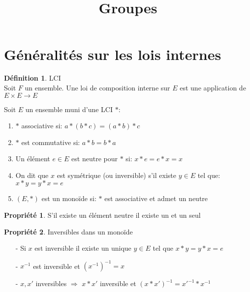 \documentclass[fleqn]{article}
\title{Groupes}
\date{}
\theoremstyle{definition} \newtheorem*{defi}{D\'efinition}
\theoremstyle{definition} \newtheorem*{theo}{Th\'eor\`eme}
\theoremstyle{definition} \newtheorem*{coro}{Corollaire}
\theoremstyle{remark} \newtheorem*{rqs}{Remarques}
\theoremstyle{definition} \newtheorem*{prop}{Propri\'et\'e}
\begin{document}
\maketitle

\section{G\'en\'eralit\'es sur les lois internes}
\begin{defi} LCI \\
Soit $F$ un ensemble. Une loi de composition interne sur $E$ est une application de $E\times E \rightarrow E$
\end{defi}

Soit $E$ un ensemble muni d'une LCI $*$:
\begin{enumerate}
	\item $*$ associative si: $a*(b*c) = (a*b)*c$
	\item $*$ est commutative si: $a*b = b*a$
	\item Un \'el\'ement $e \in E$ est neutre pour $*$ si: $x*e = e*x = x$
	\item On dit que $x$ est sym\'etrique (ou inversible) s'il existe $y \in E$ tel que: $x*y = y*x = e$
	\item $(E,*)$ est un mono\"ide si: $*$ est associative et admet un neutre
\end{enumerate}

\begin{prop}
	S'il existe un \'el\'ement neutre il existe un et un seul
\end{prop}

\begin{prop} Inversibles dans un mono\"ide
	\begin{itemize}
		\item [-] Si $x$ est inversible il existe un unique $y \in E$ tel que $x*y = y*x = e$
		\item [-] $x^{-1}$ est inversible et $(x^{-1})^{-1} = x$
		\item [-] $x, x'$ inversibles $\Rightarrow$ $x*x'$ inversible et $(x*x')^{-1} = x'^{-1}*x^{-1}$
	\end{itemize}
\end{prop}
\end{document}
